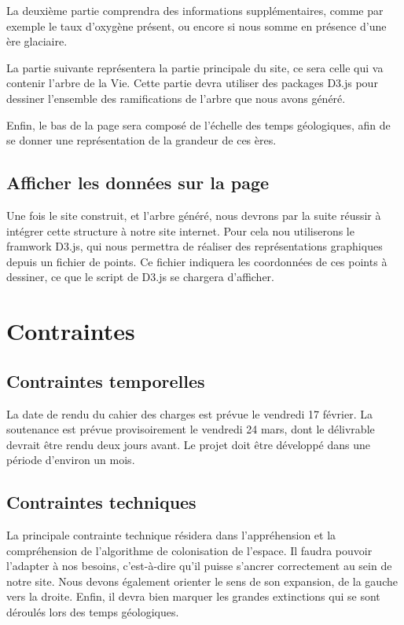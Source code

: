 \documentclass[a4paper]{article}
\begin{document}
{		La deuxième partie comprendra des informations supplémentaires, comme par exemple le taux d'oxygène présent, ou encore si nous somme en présence d'une ère glaciaire.
		
		La partie suivante représentera la partie principale du site, ce sera celle qui va contenir l'arbre de la Vie. Cette partie devra utiliser des packages D3.js pour dessiner l'ensemble des ramifications de l'arbre que nous avons généré.
		
		Enfin, le bas de la page sera composé de l'échelle des temps géologiques, afin de se donner une représentation de la grandeur de ces ères.

	\subsection{Afficher les données sur la page}
		Une fois le site construit, et l'arbre généré, nous devrons par la suite réussir à intégrer cette structure à notre site internet. Pour cela nou utiliserons le framwork D3.js, qui nous permettra de réaliser des représentations graphiques depuis un fichier de points. Ce fichier indiquera les coordonnées de ces points à dessiner, ce que le script de D3.js se chargera d'afficher.
		

\section{Contraintes}

	\subsection{Contraintes temporelles}
		La date de rendu du cahier des charges est prévue le vendredi 17 février.
		La soutenance est prévue provisoirement le vendredi 24 mars, dont le délivrable devrait être rendu deux jours avant.
		Le projet doit être développé dans une période d'environ un mois.

	\subsection{Contraintes techniques}
		La principale contrainte technique résidera dans l'appréhension et la compréhension de l'algorithme de colonisation de l'espace. Il faudra pouvoir l'adapter à nos besoins, c'est-à-dire qu'il puisse s'ancrer correctement au sein de notre site. Nous devons également orienter le sens de son expansion, de la gauche vers la droite. Enfin, il devra bien marquer les grandes extinctions qui se sont déroulés lors des temps géologiques.

}
\end{document}
